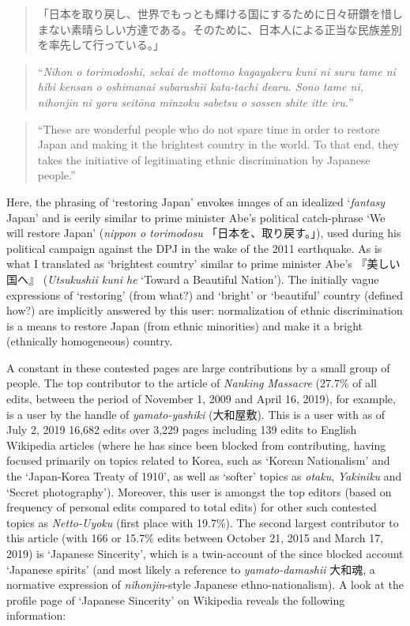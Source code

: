 \documentclass[10pt,british,A4paper,,openany]{memoir}
\begin{document}
\begin{quote}
「日本を取り戻し、世界でもっとも輝ける国にするために日々研鑽を惜しまない素晴らしい方達である。そのために、日本人による正当な民族差別を率先して行っている。」
\end{quote}

\begin{quote}
``\emph{Nihon o torimodoshi, sekai de mottomo kagayakeru kuni ni suru
tame ni hibi kensan o oshimanai subarashīi kata-tachi dearu. Sono tame
ni, nihonjin ni yoru seitōna minzoku sabetsu o sossen shite itte iru.}''
\end{quote}

\begin{quote}
``These are wonderful people who do not spare time in order to restore
Japan and making it the brightest country in the world. To that end,
they takes the initiative of legitimating ethnic discrimination by
Japanese people.''
\end{quote}

Here, the phrasing of `restoring Japan' envokes images of an idealized
`\emph{fantasy} Japan' and is eerily similar to prime minister Abe's
political catch-phrase `We will restore Japan' (\emph{nippon o
torimodosu} 「日本を、取り戻す。」), used during his political campaign
against the DPJ in the wake of the 2011 earthquake. As is what I
translated as `brightest country' similar to prime minister Abe's
『美しい国へ』 (\emph{Utsukushii kuni he} `Toward a Beautiful Nation').
The initially vague expressions of `restoring' (from what?) and `bright'
or `beautiful' country (defined how?) are implicitly answered by this
user: normalization of ethnic discrimination is a means to restore Japan
(from ethnic minorities) and make it a bright (ethnically homogeneous)
country.

A constant in these contested pages are large contributions by a small
group of people. The top contributor to the article of \emph{Nanking
Massacre} (27.7\% of all edits, between the period of November 1, 2009
and April 16, 2019), for example, is a user by the handle of
\emph{yamato-yashiki} (大和屋敷). This is a user with as of July 2, 2019
16,682 edits over 3,229 pages including 139 edits to English Wikipedia
articles (where he has since been blocked from contributing, having
focused primarily on topics related to Korea, such as `Korean
Nationalism' and the `Japan-Korea Treaty of 1910', as well as `softer'
topics as \emph{otaku}, \emph{Yakiniku} and `Secret photography').
Moreover, this user is amongst the top editors (based on frequency of
personal edits compared to total edits) for other such contested topics
as \emph{Netto-Uyoku} (first place with 19.7\%). The second largest
contributor to this article (with 166 or 15.7\% edits between October
21, 2015 and March 17, 2019) is `Japanese Sincerity', which is a
twin-account of the since blocked account `Japanese spirits' (and most
likely a reference to \emph{yamato-damashii} 大和魂, a normative
expression of \emph{nihonjin}-style Japanese ethno-nationalism). A look
at the profile page of `Japanese Sincerity' on Wikipedia reveals the
following information:
\end{document}
